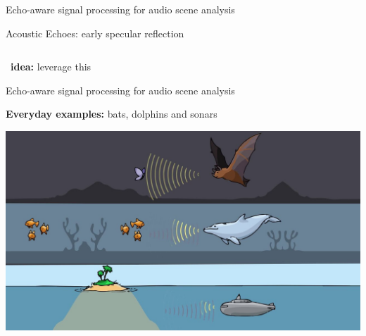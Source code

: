 \begin{frame}[t]{\alert{Echo-aware} signal processing for audio scene analysis}
\begin{mydefblock}{Acoustic Echoes: early specular reflection}
\begin{columns}[onlytextwidth]
        \end{columns}
    \end{mydefblock}

    \pause
    \begin{center}
        \faExclamation~\textbf{idea:} leverage this
    \end{center}
\end{frame}

\begin{frame}[t]{\alert{Echo-aware} signal processing for audio scene analysis}

    \textbf{Everyday examples:} bats, dolphins and sonars

    \begin{center}
        \includegraphics[width=\textwidth]{figures/echo_nature.jpg}
    \end{center}

\end{frame}

